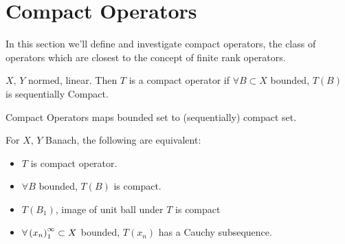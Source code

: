 \newpage
\section{Compact Operators}
In this section we'll define and investigate compact operators, the class of operators which are closest to the concept of finite rank operators.
\begin{definition}\nl
    $X$, $Y$ normed,  linear. Then $T$ is a compact operator if $\forall B\subset X$ bounded, $T(B)$ is sequentially Compact.
    
\end{definition}

\begin{remark}\nl
    {\color{blue} Compact Operators maps bounded set to (sequentially) compact set.}
\end{remark}

\begin{lemma}\nl
    For $X$, $Y$ Banach, the following are equivalent:
    \begin{itemize}
        \item $T$ is compact operator.
        \item $\forall B$ bounded, $T(B)$ is compact.
        \item $T(B_1)$, image of unit ball under $T$ is compact
        \item $\forall\left({x_n}\right)_1^\infty\subset X$ bounded, $T(x_n)$ has a Cauchy subsequence.
    \end{itemize}
\end{lemma}